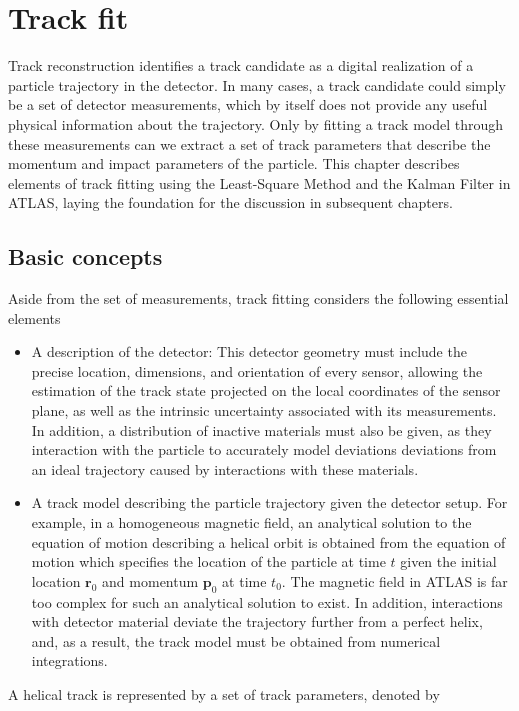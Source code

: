 \appendix
\chapter{Track fit}
\label{app:track-fit}
Track reconstruction identifies a track candidate as a digital realization of a particle trajectory in the detector. In many cases, a track candidate could simply be a set of detector measurements, which by itself does not provide any useful physical information about the trajectory. Only by fitting a track model through these measurements can we extract a set of track parameters that describe the momentum and impact parameters of the particle. This chapter describes elements of track fitting using the Least-Square Method and the Kalman Filter in ATLAS, laying the foundation for the discussion in subsequent chapters.

\section{Basic concepts}
\label{sect:track-ingredients}
Aside from the set of measurements, track fitting considers the following essential elements
\begin{itemize}
    \item A description of the detector: This detector geometry must include the precise location, dimensions, and orientation of every sensor, allowing the estimation of the track state projected on the local coordinates of the sensor plane, as well as the intrinsic uncertainty associated with its measurements. In addition, a distribution of inactive materials must also be given, as they interaction with the particle to accurately model deviations deviations from an ideal trajectory caused by interactions with these materials.
    \item A track model describing the particle trajectory given the detector setup. For example, in a homogeneous magnetic field, an analytical solution to the equation of motion describing a helical orbit is obtained from the equation of motion which specifies the location of the particle at time $t$ given the initial location $\mathbf{r}_0$ and momentum $\mathbf{p}_0$ at time $t_0$. The magnetic field in ATLAS is far too complex for such an analytical solution to exist. In addition, interactions with detector material deviate the trajectory further from a perfect helix, and, as a result, the track model must be obtained from numerical integrations. 
\end{itemize}
A helical track is represented by a set of track parameters, denoted by

